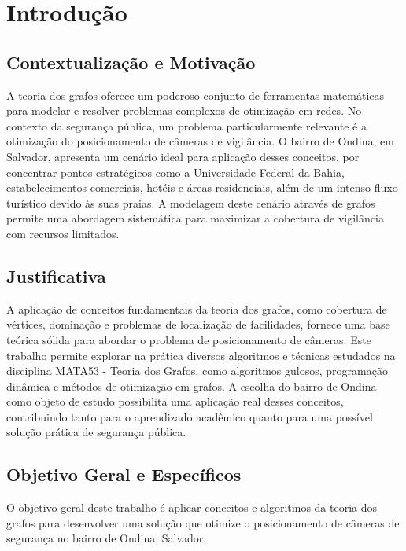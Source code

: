 \documentclass[12pt, a4paper]{report}
\begin{document}

\newpage
\tableofcontents
\thispagestyle{empty}
\newpage
\setcounter{page}{1}
\pagestyle{plain}


\section*{Introdução}

\subsection*{Contextualização e Motivação}
A teoria dos grafos oferece um poderoso conjunto de ferramentas matemáticas para modelar e resolver problemas complexos de otimização em redes. No contexto da segurança pública, um problema particularmente relevante é a otimização do posicionamento de câmeras de vigilância. O bairro de Ondina, em Salvador, apresenta um cenário ideal para aplicação desses conceitos, por concentrar pontos estratégicos como a Universidade Federal da Bahia, estabelecimentos comerciais, hotéis e áreas residenciais, além de um intenso fluxo turístico devido às suas praias. A modelagem deste cenário através de grafos permite uma abordagem sistemática para maximizar a cobertura de vigilância com recursos limitados.

\subsection*{Justificativa}
A aplicação de conceitos fundamentais da teoria dos grafos, como cobertura de vértices, dominação e problemas de localização de facilidades, fornece uma base teórica sólida para abordar o problema de posicionamento de câmeras. Este trabalho permite explorar na prática diversos algoritmos e técnicas estudados na disciplina MATA53 - Teoria dos Grafos, como algoritmos gulosos, programação dinâmica e métodos de otimização em grafos. A escolha do bairro de Ondina como objeto de estudo possibilita uma aplicação real desses conceitos, contribuindo tanto para o aprendizado acadêmico quanto para uma possível solução prática de segurança pública.

\subsection*{Objetivo Geral e Específicos}
O objetivo geral deste trabalho é aplicar conceitos e algoritmos da teoria dos grafos para desenvolver uma solução que otimize o posicionamento de câmeras de segurança no bairro de Ondina, Salvador.
\end{document}

